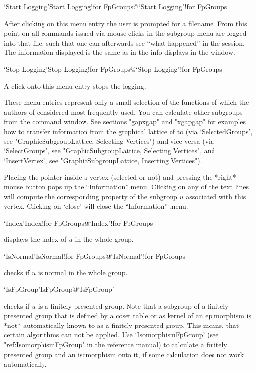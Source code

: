 \>`Start Logging'{Start Logging!for FpGroups}@{`Start Logging'!for FpGroups}

After clicking on this menu entry the user is prompted for a filename. From 
this point on all commands issued via mouse clicks in the subgroup menu are 
logged into that file, such that one can afterwards see ``what happened''
in the {\XGAP} session. The information displayed is the same as in the
info displays in the {\GAP} window. 

\>`Stop Logging'{Stop Logging!for FpGroups}@{`Stop Logging'!for FpGroups}

A click onto this menu entry stops the {\XGAP} logging.

\bigskip%

These menu entries represent only a small selection of the functions of
{\GAP} which the authors of {\XGAP} considered most frequently used. You
can calculate other subgroups from
the {\GAP} command window. See sections "gapxgap" and
"xgapgap" for examples how to transfer information from the graphical
lattice of {\XGAP} to {\GAP} (via `SelectedGroups', see
"GraphicSubgroupLattice, Selecting Vertices") and vice versa (via
`SelectGroups', see "GraphicSubgroupLattice, Selecting Vertices", and
`InsertVertex', see "GraphicSubgroupLattice, Inserting Vertices").



Placing the pointer  inside a vertex (selected  or not) and  pressing the
*right* mouse button pops up the ``Information''  menu.  Clicking on any of
the text  lines will compute the corresponding   property of the subgroup
$u$  associated  with this  vertex. Clicking  on `close'  will  close the
``Information'' menu.

\>`Index'{Index!for FpGroups}@{`Index'!for FpGroups}

displays  the index of  $u$ in the whole  group.

\>`IsNormal'{IsNormal!for FpGroups}@{`IsNormal'!for FpGroups}

checks  if $u$ is  normal  in the  whole group.

\>`IsFpGroup'{IsFpGroup}@{`IsFpGroup'}

checks if $u$ is a finitely presented group. Note that a subgroup of a
finitely presented group that is defined by a coset table or as kernel
of an epimorphism is *not* automatically known to {\GAP} as a finitely
presented group. This means, that certain algorithms can not be
applied. Use `IsomorphismFpGroup' (see "ref:IsomorphismFpGroup" in the
{\GAP} reference manual) to calculate a finitely presented group and
an isomorphism onto it, if some calculation does not work automatically.

